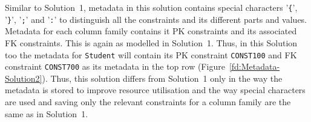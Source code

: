 Similar to Solution~1,   metadata in this solution contains special characters
'\texttt{\{}',  '\texttt{\}}', '\texttt{;}' and '\texttt{:}' to distinguish all
the constraints and its different parts and values.  Metadata  for each
column family contains it \ac{PK} constraints and its associated \ac{FK}
constraints.  This is again as modelled in Solution~1.  Thus,  in this Solution too
the metadata for \texttt{Student} will contain its \ac{PK} constraint
\texttt{CONST100} and \ac{FK} constraint \texttt{CONST700} as its metadata in
the top row (Figure~\ref{fd:Metadata-Solution2}). Thus,  this solution differs
from Solution~1 only in the way the metadata is stored to improve resource
utilisation and the way special characters are used and saving only the
relevant constraints for a column family are  the same as in Solution~1. 
	
% 
	
